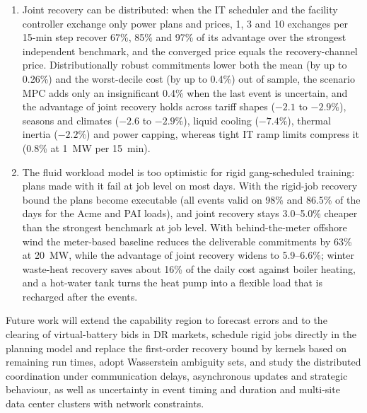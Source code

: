 \begin{enumerate}[label=(\arabic*),leftmargin=1.9em,itemsep=1.5pt]
14--16\% when the commitments approach the single-event capabilities; coupled commitment with joint recovery is 12.6\%
cheaper than single-event assessment with independent recovery. The saving comes from the rebound charge (78\%) when
rebound is priced and from the additional DR payment (86\%) under the Jiangsu settlement alone, not from energy
arbitrage.
\item Joint recovery can be distributed: when the IT scheduler and the facility controller exchange only power plans
and prices, 1, 3 and 10 exchanges per 15-min step recover 67\%, 85\% and 97\% of its advantage over the strongest
independent benchmark, and the converged price equals the recovery-channel price. Distributionally robust commitments
lower both the mean (by up to 0.26\%) and the worst-decile cost (by up to 0.4\%) out of sample, the scenario MPC adds
only an insignificant 0.4\% when the last event is uncertain, and the advantage of joint recovery holds across tariff
shapes ($-2.1$ to $-2.9\%$), seasons and climates ($-2.6$ to $-2.9\%$), liquid cooling ($-7.4\%$), thermal inertia
($-2.2\%$) and power capping, whereas tight IT ramp limits compress it (0.8\% at 1~MW per 15~min).
\item The fluid workload model is too optimistic for rigid gang-scheduled training: plans made with it fail at job level
on most days. With the rigid-job recovery bound the plans become executable (all events valid on 98\% and 86.5\% of the
days for the Acme and PAI loads), and joint recovery stays 3.0--5.0\% cheaper than the strongest benchmark at job level.
With behind-the-meter offshore wind the meter-based baseline reduces the deliverable commitments by 63\% at 20~MW, while
the advantage of joint recovery widens to 5.9--6.6\%; winter waste-heat recovery saves about 16\% of the daily cost
against boiler heating, and a hot-water tank turns the heat pump into a flexible load that is recharged after the events.
\end{enumerate}

Future work will extend the capability region to forecast errors and to the clearing of virtual-battery bids in DR
markets, schedule rigid jobs directly in the planning model and replace the first-order recovery bound by kernels based
on remaining run times, adopt Wasserstein ambiguity sets, and study the distributed coordination under communication
delays, asynchronous updates and strategic behaviour, as well as uncertainty in event timing and duration and
multi-site data center clusters with network constraints.
